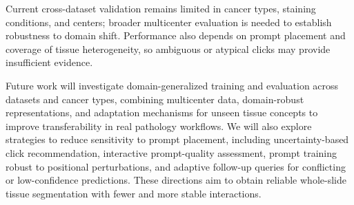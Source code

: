 \documentclass[letterpaper]{article}
\begin{document}
Current cross-dataset validation remains limited in cancer types, staining conditions, and centers; broader multicenter evaluation is needed to establish robustness to domain shift. Performance also depends on prompt placement and coverage of tissue heterogeneity, so ambiguous or atypical clicks may provide insufficient evidence.

Future work will investigate domain-generalized training and evaluation across datasets and cancer types, combining multicenter data, domain-robust representations, and adaptation mechanisms for unseen tissue concepts to improve transferability in real pathology workflows. We will also explore strategies to reduce sensitivity to prompt placement, including uncertainty-based click recommendation, interactive prompt-quality assessment, prompt training robust to positional perturbations, and adaptive follow-up queries for conflicting or low-confidence predictions. These directions aim to obtain reliable whole-slide tissue segmentation with fewer and more stable interactions.


\end{document}
